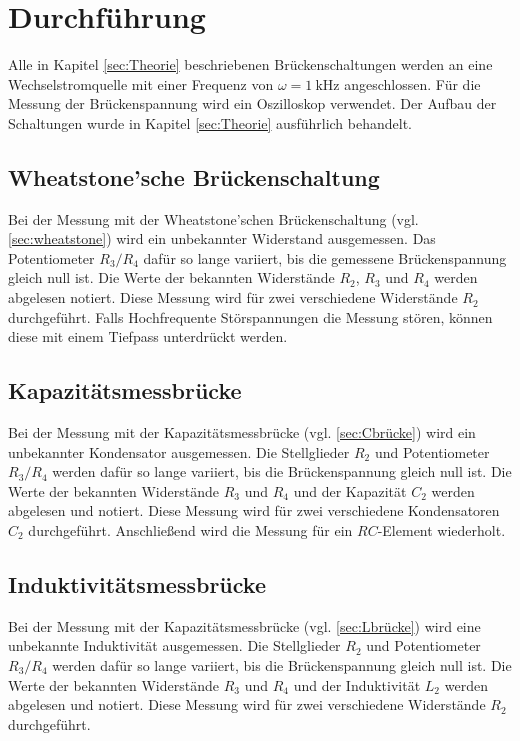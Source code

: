 \section{Durchführung}
\label{sec:Durchführung}
Alle in Kapitel \ref{sec:Theorie} beschriebenen Brückenschaltungen werden an eine Wechselstromquelle mit einer Frequenz von 
$\omega=\SI{1}{\kilo\hertz}$ angeschlossen. Für die Messung der Brückenspannung wird ein Oszilloskop verwendet. Der Aufbau der 
Schaltungen wurde in Kapitel \ref{sec:Theorie} ausführlich behandelt. 

\subsection{Wheatstone'sche Brückenschaltung}
\label{sec:durch-wheatstone}
Bei der Messung mit der Wheatstone'schen Brückenschaltung (vgl. \ref{sec:wheatstone}) wird ein unbekannter Widerstand ausgemessen.
Das Potentiometer $R_3/R_4$ dafür so lange variiert, bis die gemessene Brückenspannung gleich null ist. 
Die Werte der bekannten Widerstände $R_2$, $R_3$ und $R_4$ werden abgelesen notiert.
Diese Messung wird für zwei verschiedene Widerstände $R_2$ durchgeführt.
Falls Hochfrequente Störspannungen die Messung stören, können diese mit einem Tiefpass unterdrückt werden. 

\subsection{Kapazitätsmessbrücke}
\label{sec:durch-Cbrücke}
Bei der Messung mit der Kapazitätsmessbrücke (vgl. \ref{sec:Cbrücke}) wird ein unbekannter Kondensator ausgemessen. 
Die Stellglieder $R_2$ und Potentiometer $R_3/R_4$ werden dafür so lange variiert, bis die Brückenspannung gleich null ist.
Die Werte der bekannten Widerstände $R_3$ und $R_4$ und der Kapazität $C_2$ werden abgelesen und notiert. 
Diese Messung wird für zwei verschiedene Kondensatoren $C_2$ durchgeführt.
Anschließend wird die Messung für ein $RC$-Element wiederholt.

\subsection{Induktivitätsmessbrücke}
\label{sec:durch-Lbrücke}
Bei der Messung mit der Kapazitätsmessbrücke (vgl. \ref{sec:Lbrücke}) wird eine unbekannte Induktivität ausgemessen. 
Die Stellglieder $R_2$ und Potentiometer $R_3/R_4$ werden dafür so lange variiert, bis die Brückenspannung gleich null ist.
Die Werte der bekannten Widerstände $R_3$ und $R_4$ und der Induktivität $L_2$ werden abgelesen und notiert.
Diese Messung wird für zwei verschiedene Widerstände $R_2$ durchgeführt.

